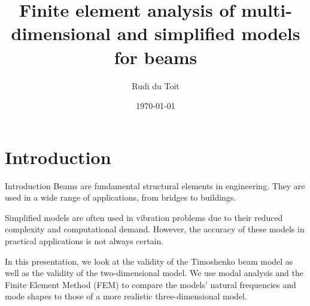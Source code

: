 \documentclass[8pt]{beamer}
\title{Finite element analysis of multi-dimensional and simplified models for beams}
\author{Rudi du Toit}
\date{\today}
\institute{University of Pretoria}
\begin{document}



\begin{frame}[plain]
\titlepage
\end{frame}

\section{Introduction}
    \begin{frame}{Introduction}
        Beams are fundamental structural elements in engineering. They are used in a wide range of applications, from bridges to buildings.

        Simplified models are often used in vibration problems due to their reduced complexity and computational demand. However, the accuracy of these models in practical applications is not always certain.

        In this presentation, we look at the validity of the Timoshenko beam model as well as the validity of the two-dimensional model. We use modal analysis and the Finite Element Method (FEM) to compare the models' natural frequencies and mode shapes to those of a more realistic three-dimensional model.
    \end{frame}
\end{document}
